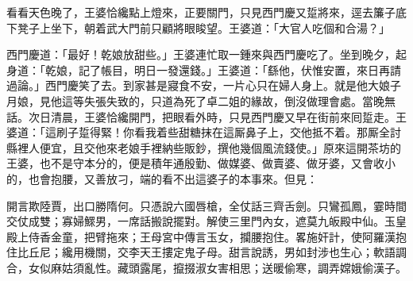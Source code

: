 看看天色晚了，王婆恰纔點上燈來，正要關門，只見西門慶又踅將來，逕去簾子底下凳子上坐下，朝着武大門前只顧將眼睃望。{}王婆道：「大官人吃個和合湯？」

西門慶道：「最好！乾娘放甜些。」王婆連忙取一鍾來與西門慶吃了。坐到晚夕，起身道：「乾娘，記了帳目，明日一發還錢。」王婆道：「繇他，伏惟安置，來日再請過論。」西門慶笑了去。到家甚是寢食不安，一片心只在婦人身上。就是他大娘子月娘，{}見他這等失張失致的，只道為死了卓二姐的緣故，倒沒做理會處。當晚無話。次日清晨，王婆恰纔開門，把眼看外時，只見西門慶又早在街前來囘踅走。王婆道：「這刷子踅得緊！你看我着些甜糖抹在這厮鼻子上，交他抵不着。那厮全討縣裡人便宜，且交他來老娘手裡納些販鈔，撰他幾個風流錢使。」原來這開茶坊的王婆，也不是守本分的，便是積年通殷勤、做媒婆、做賣婆、做牙婆，又會收小的，也會抱腰，又善放刁，端的看不出這婆子的本事來。但見：

\begin{myquote}
開言欺陸賈，出口勝隋何。只憑說六國唇槍，全仗話三齊舌劍。只鸞孤鳳，霎時間交仗成雙；寡婦鰥男，一席話搬說擺對。解使三里門內女，遮莫九皈殿中仙。玉皇殿上侍香金童，把臂拖來；王母宮中傳言玉女，攔腰抱住。畧施奸計，使阿羅漢抱住比丘尼；纔用機關，交李天王摟定鬼子母。甜言說誘，男如封涉也生心；軟語調合，女似麻姑須亂性。藏頭露尾，攛掇淑女害相思；送暖偷寒，調弄嫦娥偷漢子。
\end{myquote}

